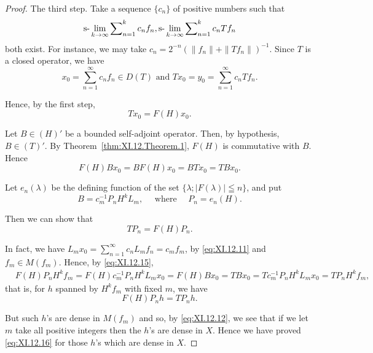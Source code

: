 \begin{proof}
The third step. Take a sequence $\{c_n\}$ of positive numbers such that 
\[
\text{s-}\lim _{k \to \infty} \sum\nolimits_{n=1} ^{k} c _{n} f _{n}, \text{s-}\lim _{k \to \infty} \sum\nolimits_{n=1} ^{k} c _{n} T f _{n}
\]
both exist. For instance, we may take $c_{n} = 2^{-n} (\|f_{n}\| + \|Tf_{n}\|)^{-1}$. Since $T$ is a closed operator, we have 
\begin{equation}\label{eq:XI.12.13}
x _{0} = \sum\limits_{n=1} ^{\infty} c _{n} f _{n} \in D (T) \text{ and } T x _{0} = y _{0} = \sum\limits_{n=1} ^{\infty} c _{n} T f _{n}.
\end{equation}

Hence, by the first step, 
\begin{equation}\label{eq:XI.12.14}
T x _{0} = F (H) x _{0}.
\end{equation}

Let $B \in (H)'$ be a bounded self-adjoint operator. Then, by hypothesis, $B \in (T)'$. By Theorem~\ref{thm:XI.12.Theorem.1}, $F(H)$ is commutative with $B$. Hence 
\begin{equation}\label{eq:XI.12.15}
F (H) B x _{0} = B F (H) x _{0} = B T x _{0} = T B x _{0}.
\end{equation}

Let $e_n(\lambda)$ be the defining function of the set $\{\lambda; |F(\lambda)| \leqq n\}$, and put 
\[
B = c _{m} ^{-1} P _{n} H ^{k} L _{m}, \quad \text{ where } \quad P _{n} = e _{n} (H).
\]

Then we can show that 
\begin{equation}\label{eq:XI.12.16}
T P _{n} = F (H) P _{n}.
\end{equation}

In fact, we have $L_{m}x_{0} = \sum\limits_{n=1}^{\infty} c_{n}L_{m}f_{n} = c_{m}f_{m}$, by \eqref{eq:XI.12.11} and $f_{m} \in M(f_{m})$. Hence, by \eqref{eq:XI.12.15}, 
\[
\begin{aligned}
&F (H) P _{n} H ^{k} f _{m}  = F (H) c _{m} ^{-1} P _{n} H ^{k} L _{m} x _{0} = F (H) B x _{0} = T B x _{0} = T c _{m} ^{-1} P _{n} H ^{k} L _{m} x _{0} = T P _{n} H ^{k} f _{m},
\end{aligned}
\]
that is, for $h$ spanned by $H^{k}f_{m}$ with fixed $m$, we have 
\begin{equation}\tag{16'}\label{eq:XI.12.16'}
F (H) P _{n} h = T P _{n} h.
\end{equation}

But such $h$'s are dense in $M(f_m)$ and so, by \eqref{eq:XI.12.12}, we see that if we let $m$ take all positive integers then the $h$'s are dense in $X$. Hence we have proved \eqref{eq:XI.12.16} for those $h$'s which are dense in $X$. 


\end{proof}
